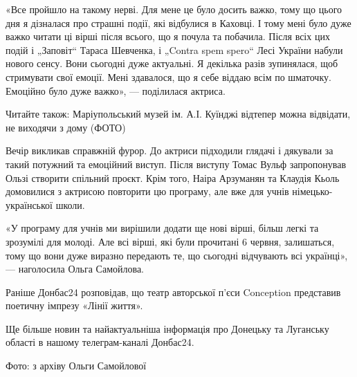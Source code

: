 «Все пройшло на такому нерві. Для мене це було досить важко, тому що цього дня
я дізналася про страшні події, які відбулися в Каховці. І тому мені було дуже
важко читати ці вірші після всього, що я почула та побачила. Після всіх цих
подій і „Заповіт“ Тараса Шевченка, і „Contra spem spero“ Лесі України набули
нового сенсу. Вони сьогодні дуже актуальні. Я декілька разів зупинялася, щоб
стримувати свої емоції. Мені здавалося, що я себе віддаю всім по шматочку.
Емоційно було дуже важко», — поділилася актриса.

Читайте також: Маріупольський музей ім. А.І. Куїнджі відтепер можна відвідати,
не виходячи з дому (ФОТО)

Вечір викликав справжній фурор. До актриси підходили глядачі і дякували за
такий потужний та емоційний виступ. Після виступу Томас Вульф запропонував
Ользі створити спільний проєкт. Крім того, Наіра Арзуманян та Клаудія Кьоль
домовилися з актрисою повторити цю програму, але вже для учнів
німецько-української школи.

«У програму для учнів ми вирішили додати ще нові вірші, більш легкі та
зрозумілі для молоді. Але всі вірші, які були прочитані 6 червня, залишаться,
тому що вони дуже виразно передають те, що сьогодні відчувають всі українці», —
наголосила Ольга Самойлова.

Раніше Донбас24 розповідав, що театр авторської п'єси Conception представив
поетичну імпрезу «Лінії життя».

Ще більше новин та найактуальніша інформація про Донецьку та Луганську області
в нашому телеграм-каналі Донбас24.

Фото: з архіву Ольги Самойлової
